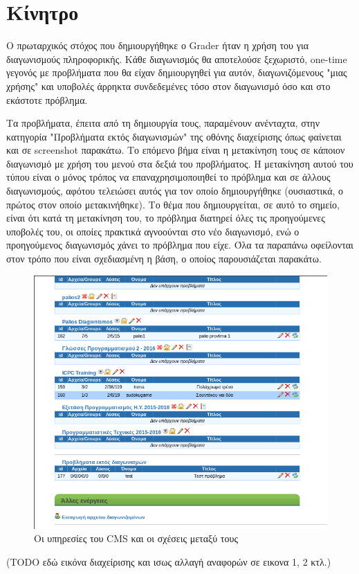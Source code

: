 \documentclass[diploma]{softlab-thesis}
\begin{document}
\section{Κίνητρο}

Ο πρωταρχικός στόχος που δημιουργήθηκε ο Grader ήταν η χρήση του για διαγωνισμούς
πληροφορικής. Κάθε διαγωνισμός θα αποτελούσε ξεχωριστό, one-time γεγονός με
προβλήματα που θα είχαν δημιουργηθεί για αυτόν, διαγωνιζόμενους "μιας χρήσης"
και υποβολές άρρηκτα συνδεδεμένες τόσο στον διαγωνισμό όσο και στο εκάστοτε
πρόβλημα.

\bigskip

Τα προβλήματα, έπειτα από τη δημιουργία τους, παραμένουν ανένταχτα, στην κατηγορία
"Προβλήματα εκτός διαγωνισμών" της οθόνης διαχείρισης
όπως φαίνεται και σε screenshot παρακάτω. Το επόμενο βήμα είναι η μετακίνηση τους
σε κάποιον διαγωνισμό με χρήση του μενού στα δεξιά του προβλήματος. Η μετακίνηση
αυτού του τύπου είναι ο μόνος τρόπος να επαναχρησιμοποιηθεί το πρόβλημα και σε
άλλους διαγωνισμούς, αφότου τελειώσει αυτός για τον οποίο δημιουργήθηκε
(ουσιαστικά, ο πρώτος στον οποίο μετακινήθηκε). Το θέμα που δημιουργείται, σε αυτό
το σημείο, είναι ότι κατά τη μετακίνηση του, το πρόβλημα διατηρεί όλες τις
προηγούμενες υποβολές του, οι οποίες πρακτικά αγνοούνται στο νέο διαγωνισμό, ενώ
ο προηγούμενος διαγωνισμός χάνει το πρόβλημα που είχε. Όλα τα παραπάνω οφείλονται
στον τρόπο που είναι σχεδιασμένη η βάση, ο οποίος παρουσιάζεται παρακάτω.

\bigskip

\begin{figure}
  \centering
  \includegraphics[scale=0.4,trim=4 4 4 4,clip]{Figures/beforesep.png}
  \caption[Η αρχιτεκτονική του CMS]{Οι υπηρεσίες του CMS και οι σχέσεις μεταξύ τους}
\end{figure}
(TODO εδώ εικόνα διαχείρισης και ισως αλλαγή αναφορών σε εικονα 1, 2 κτλ.)
\end{document}
